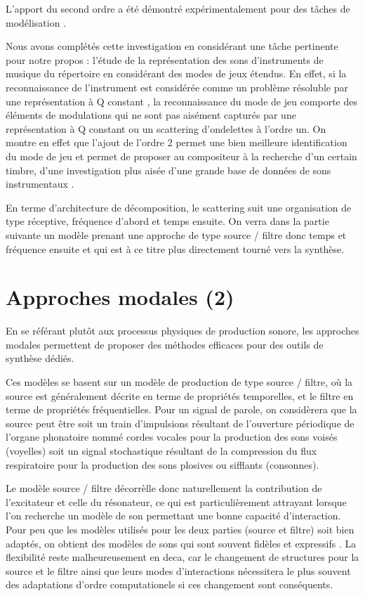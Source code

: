 L'apport du second ordre a été démontré expérimentalement pour des tâches de modélisation \cite{anden2014deep}.

Nous avons complétés cette investigation en considérant une tâche pertinente pour notre propos : l'étude de la représentation des sons d'instruments de musique du répertoire en considérant des modes de jeux étendus. En effet, si la reconnaissance de l'instrument est considérée comme un problème résoluble par une représentation à Q constant \cite{}, la reconnaissance du mode de jeu comporte des éléments de modulations qui ne sont pas aisément capturés par une représentation à Q constant ou un scattering d'ondelettes à l'ordre un. On montre en effet que l'ajout de l'ordre 2 permet une bien meilleure identification du mode de jeu et permet de proposer au compositeur à la recherche d'un certain timbre, d'une investigation plus aisée d'une grande base de données de sons instrumentaux \cite{}.

En terme d'architecture de décomposition, le scattering suit une organisation de type réceptive, fréquence d'abord et temps ensuite. On verra dans la partie suivante un modèle prenant une approche de type source / filtre donc temps et fréquence ensuite et qui est à ce titre plus directement tourné vers la synthèse.

\section{Approches modales (2)}

En se référant plutôt aux processus physiques de production sonore, les approches modales permettent de proposer des méthodes efficaces pour des outils de synthèse dédiés.

Ces modèles se basent sur un modèle de production de type source / filtre, où la source est généralement décrite en terme de propriétés temporelles, et le filtre en terme de propriétés fréquentielles. Pour un signal de parole, on considèrera que la source peut être soit un train d'impulsions résultant de l'ouverture périodique de l'organe phonatoire nommé  cordes vocales pour la production des sons voisés (voyelles) soit un signal stochastique résultant de la compression du flux respiratoire pour la production des sons plosives ou sifflants (consonnes).

Le modèle source / filtre décorrèlle donc naturellement la contribution de l'excitateur et celle du résonateur, ce qui est particulièrement attrayant lorsque l'on recherche un modèle de son permettant une bonne capacité d'interaction. Pour peu que les modèles utilisés pour les deux parties (source et filtre) soit bien adaptés, on obtient des modèles de sons qui sont souvent fidèles et expressifs \cite{modalys, marseille}. La flexibilité reste malheureusement en deca, car le changement de structures pour la source et le filtre ainsi que leurs modes d'interactions nécessitera le plus souvent des adaptations d'ordre computationels si ces changement sont conséquents.

